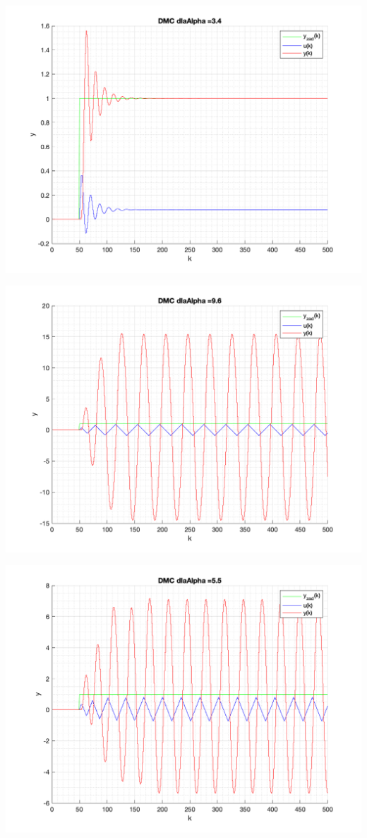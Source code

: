 \documentclass[a4paper, 11pt]{article}
\begin{document}
\begin{enumerate}
 \includegraphics[width=\linewidth]{./ModelsDodatkowe_Alpha/P4_DMC_Alpha_3_4_png.png} 
 
 \includegraphics[width=\linewidth]{./ModelsDodatkowe_Alpha/P4_DMC_Alpha_9_6_png.png} 
 
 \includegraphics[width=\linewidth]{./ModelsDodatkowe_Alpha/P4_DMC_Alpha_5_5_png.png} 
 

\end{enumerate}
\end{document}
